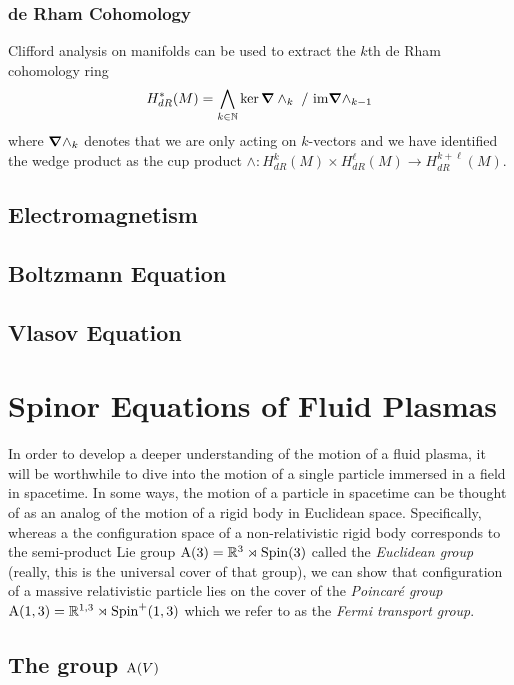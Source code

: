 \documentclass[conf]{new-aiaa}
\begin{document}
\subsubsection{de Rham Cohomology}

Clifford analysis on manifolds can be used to extract the $k$th de Rham cohomology ring
\begin{equation}
H^*_{dR}(M) = \bigwedge_{k \in \mathbb{N}} \ker \boldsymbol{\nabla} \wedge_k ~/~ \mathrm{im} \boldsymbol{\nabla} \wedge_{k-1}
\end{equation}
where $\boldsymbol{\nabla} \wedge_k$ denotes that we are only acting on $k$-vectors and we have identified the wedge product as the cup product $\wedge \colon H^k_{dR}(M) \times H^\ell_{dR}(M) \to H^{k+\ell}_{dR}(M)$. 

\subsection{Electromagnetism}

\subsection{Boltzmann Equation}

\subsection{Vlasov Equation}

\section{Spinor Equations of Fluid Plasmas}

In order to develop a deeper understanding of the motion of a fluid plasma, it will be worthwhile to dive into the motion of a single particle immersed in a field in spacetime. In some ways, the motion of a particle in spacetime can be thought of as an analog of the motion of a rigid body in Euclidean space. Specifically, whereas a the configuration space of a non-relativistic rigid body corresponds to the semi-product Lie group $\mathrm{A}(3)=\mathbb{R}^3 \rtimes \operatorname{Spin}(3)$ called the \emph{Euclidean group} (really, this is the universal cover of that group), we can show that configuration of a massive relativistic particle lies on the cover of the \emph{Poincar\'e group} $\mathrm{A}(1,3) = \mathbb{R}^{1,3} \rtimes \operatorname{Spin}^+(1,3)$ which we refer to as the \emph{Fermi transport group}.

\subsection{The group $\operatorname{A}(V)$}
\end{document}

